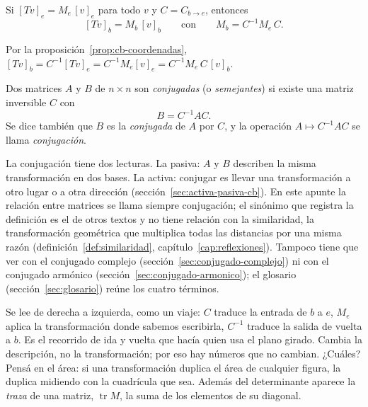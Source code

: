 \begin{proposicion}\label{prop:cb-semejanza}
Si \([Tv]_e=M_e\,[v]_e\) para todo \(v\) y \(C=C_{b\to e}\), entonces
\[
  [Tv]_b=M_b\,[v]_b\qquad\text{con}\qquad M_b=C^{-1}M_e\,C .
\]
\end{proposicion}

\begin{demostracion}
Por la proposición~\ref{prop:cb-coordenadas},
\([Tv]_b=C^{-1}[Tv]_e=C^{-1}M_e[v]_e=C^{-1}M_e\,C\,[v]_b\).
\end{demostracion}

\begin{definicion}\label{def:conjugacion}
Dos matrices \(A\) y \(B\) de \(n\times n\) son \emph{conjugadas} (o \emph{semejantes}) si
existe una matriz inversible \(C\) con
\[
  B=C^{-1}AC .
\]
Se dice también que \(B\) es la \emph{conjugada} de \(A\) por \(C\), y la operación
\(A\mapsto C^{-1}AC\) se llama \emph{conjugación}.
\end{definicion}

\begin{atencion}
La conjugación tiene dos lecturas. La pasiva: \(A\) y \(B\) describen la misma transformación
en dos bases. La activa: conjugar es llevar una transformación a otro lugar o a otra
dirección (sección~\ref{sec:activa-pasiva-cb}). En este apunte la relación entre matrices se
llama siempre conjugación; el sinónimo que registra la definición es el de otros textos y no
tiene relación con la similaridad, la transformación geométrica que multiplica todas las
distancias por una misma razón (definición~\ref{def:similaridad}, capítulo~\ref{cap:reflexiones}).
Tampoco tiene que ver con el conjugado complejo (sección~\ref{sec:conjugado-complejo}) ni con
el conjugado armónico (sección~\ref{sec:conjugado-armonico}); el glosario
(sección~\ref{sec:glosario}) reúne los cuatro términos.
\end{atencion}

Se lee de derecha a izquierda, como un viaje: \(C\) traduce la entrada de \(b\) a \(e\),
\(M_e\) aplica la transformación donde sabemos escribirla, \(C^{-1}\) traduce la salida de
vuelta a \(b\). Es el recorrido de ida y vuelta que hacía quien usa el plano girado.
Cambia la descripción, no la transformación; por eso hay números que no cambian. ¿Cuáles?
Pensá en el área: si una transformación duplica el área de cualquier figura, la duplica midiendo
con la cuadrícula que sea. Además del determinante aparece la \emph{traza} de una matriz,
\(\operatorname{tr}M\), la suma de los elementos de su diagonal.

